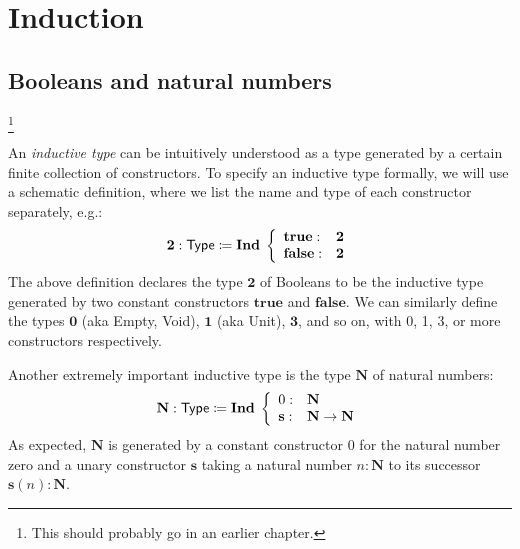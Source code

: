 \newcommand{\zero}{\ensuremath{\mathbf{0}}\xspace}
\newcommand{\one}{\ensuremath{\mathbf{1}}\xspace}
\newcommand{\two}{\ensuremath{\mathbf{2}}\xspace}
\newcommand{\three}{\ensuremath{\mathbf{3}}\xspace}
\newcommand{\nat}{\ensuremath{\mathbf{N}}\xspace}
\newcommand{\lst}{\ensuremath{\mathbf{List}}\xspace}
\newcommand{\true}{\ensuremath{\mathbf{true}}\xspace}
\newcommand{\false}{\ensuremath{\mathbf{false}}\xspace}
\newcommand{\rec}{\ensuremath{\mathbf{rec}}\xspace}
\newcommand{\supp}{\ensuremath{\mathbf{sup}}\xspace}
\newcommand{\z}{\ensuremath{0}\xspace}
\newcommand{\wtype}[1]{\ensuremath{W}(#1),\xspace}
\newcommand{\ind}{\ensuremath{\mathbf{Ind \;}}\xspace}
\newcommand{\s}{\ensuremath{\mathbf{s}}\xspace}
\newcommand{\alt}{\;|\;\;}
\newcommand{\disj}[2]{#1 + #2}
\newcommand{\der}{\vdash}
\newcommand{\dbl}{\ensuremath{\mathbf{double}}}

\chapter{Induction}
\label{cha:induction}

\section{Booleans and natural numbers}\footnote{This should probably go in an earlier chapter.}


An \emph{inductive type} can be intuitively understood as a type generated by a certain finite collection of constructors. To specify an inductive type formally,
we will use a schematic definition, where we list the name and type of each constructor separately, e.g.:
\[ \two : \type \defeq \ind \left\{ 
\begin{array}{ll}
\true : &\two \\
\false : &\two
\end{array}
\right. \]     
The above definition declares the type $\two$ of Booleans to be the inductive type generated by two constant constructors $\true$ and $\false$. We can similarly define the types $\zero$ (aka Empty, Void), $\one$ (aka Unit), $\three$, and so on, with 0, 1, 3, or more constructors respectively. 

Another extremely important inductive type is the type $\nat$ of natural numbers:  
\[  \nat : \type \defeq \ind \left\{ 
\begin{array}{ll}
\z : & \nat \\
\s : & \nat \to \nat
\end{array}
\right. \]
As expected, $\nat$ is generated by a constant constructor $\z$ for the natural number zero and a unary constructor $\s$ taking a natural number $n : \nat$ to its successor $\s(n) : \nat$. 


